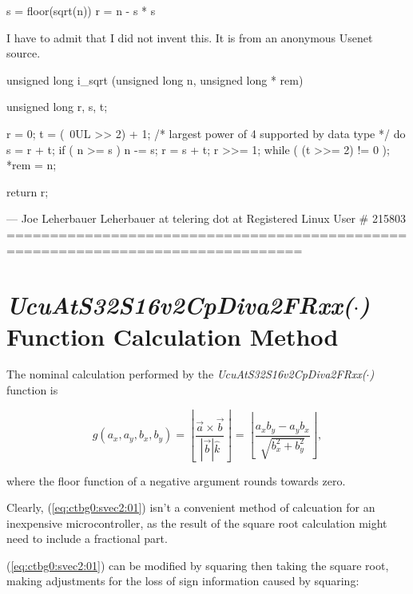 \begin{tiny}
s = floor(sqrt(n))
r = n - s * s

I have to admit that I did not invent this.
It is from an anonymous Usenet source.

unsigned long
i\_sqrt (unsigned long n, unsigned long * rem)
{
 unsigned long r, s, t;

 r = 0;
 t = (~0UL >> 2) + 1;   /* largest power of 4 supported by data type */
 do
   {
     s = r + t;
     if ( n >= s )
       {
         n -= s;
         r = s + t;
       }
     r >>= 1;
   }
 while ( (t >>= 2) != 0 );
 *rem = n;

 return r;

}

---
Joe Leherbauer             Leherbauer at telering dot at
                          Registered Linux User \# 215803
================================================================================
\end{tiny}


\section[\emph{UcuAtS32S16v2CpDiva2FRxx(\protect\mbox{\protect$\cdot$})} Function Calculation Method]
        {\emph{UcuAtS32S16v2CpDiva2FRxx(\protect\mbox{\protect\boldmath $\cdot$})} Function Calculation Method}
\label{ctbg0:svec2}

%
The nominal calculation performed by the
\emph{UcuAtS32S16v2CpDiva2FRxx($\cdot$)} function is

\begin{equation}
\label{eq:ctbg0:svec2:01}
g(a_x, a_y, b_x, b_y)
=
\left\lfloor \frac{\vec{a} \times \vec{b}}{| \vec{b} | \hat{k}} \right\rfloor
=
\left\lfloor \frac{a_x b_y - a_y b_x}{\sqrt{b_x^2 + b_y^2}} \right\rfloor ,
\end{equation}

\noindent{}where the floor function of a negative argument rounds towards zero.

Clearly, (\ref{eq:ctbg0:svec2:01}) isn't a convenient method of calcuation for an
inexpensive microcontroller, as the result
of the square root calculation might need to include a fractional part.

(\ref{eq:ctbg0:svec2:01}) can be modified by squaring then taking the square root,
making adjustments for the loss of sign information caused by squaring:

